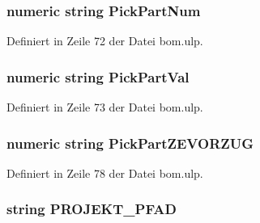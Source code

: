 \hypertarget{bom_8ulp_ac1febc97d5c168ba555c840a75aa53c0}{}
\subsubsection[{Pick\+Part\+Num}]{\setlength{\rightskip}{0pt plus 5cm}numeric string Pick\+Part\+Num}\label{bom_8ulp_ac1febc97d5c168ba555c840a75aa53c0}


Definiert in Zeile 72 der Datei bom.\+ulp.

\hypertarget{bom_8ulp_a143703109bf0f522339429ad817b5c5c}{}
\subsubsection[{Pick\+Part\+Val}]{\setlength{\rightskip}{0pt plus 5cm}numeric string Pick\+Part\+Val}\label{bom_8ulp_a143703109bf0f522339429ad817b5c5c}


Definiert in Zeile 73 der Datei bom.\+ulp.

\hypertarget{bom_8ulp_a19ed50ff9a03f9fcec5a13995ab5d040}{}
\subsubsection[{Pick\+Part\+Z\+E\+V\+O\+R\+Z\+U\+G}]{\setlength{\rightskip}{0pt plus 5cm}numeric string Pick\+Part\+Z\+E\+V\+O\+R\+Z\+U\+G}\label{bom_8ulp_a19ed50ff9a03f9fcec5a13995ab5d040}


Definiert in Zeile 78 der Datei bom.\+ulp.

\hypertarget{bom_8ulp_a646f3371d3767b31d185e665e471cd8c}{}
\subsubsection[{P\+R\+O\+J\+E\+K\+T\+\_\+\+P\+F\+A\+D}]{\setlength{\rightskip}{0pt plus 5cm}string P\+R\+O\+J\+E\+K\+T\+\_\+\+P\+F\+A\+D}\label{bom_8ulp_a646f3371d3767b31d185e665e471cd8c}


